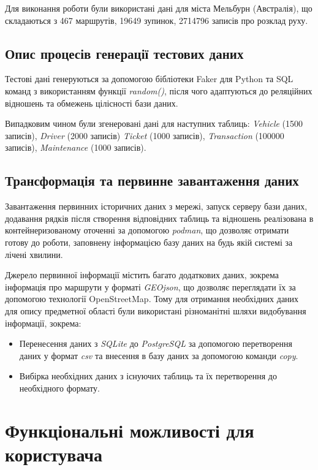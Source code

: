 \documentclass[oneside,14pt]{extarticle}
\begin{document}
Для виконання роботи були використані дані для міста Мельбурн (Австралія), що складаються з 467 маршрутів, 19649 зупинок, 2714796 записів про розклад руху.

\subsection{Опис процесів генерації тестових даних}
Тестові дані генеруються за допомогою бібліотеки Faker для Python та SQL команд з використанням функції \textit{random()}, після чого адаптуються до реляційних відношень та обмежень цілісності бази даних. 

Випадковим чином були згенеровані дані для наступних таблиць: \textit{Vehicle} (1500 записів), \textit{Driver} (2000 записів) \textit{Ticket} (1000 записів), \textit{Transaction} (100000 записів), \textit{Maintenance} (1000 записів).

\subsection{Трансформація та первинне завантаження даних}
Завантаження первинних історичних даних з мережі, запуск серверу бази даних, додавання рядків після створення відповідних таблиць та відношень реалізована в контейнеризованому оточенні за допомогою \textit{podman}, що дозволяє отримати готову до роботи, заповнену інформацією базу даних на будь якій системі за лічені хвилини.

Джерело первинної інформації містить багато додаткових даних, зокрема інформація про маршрути у форматі \textit{GEOjson}, що дозволяє переглядати їх за допомогою технології OpenStreetMap. Тому для отримання необхідних даних для опису предметної області були використані різноманітні шляхи видобування інформації, зокрема: 
\begin{itemize}
\item Перенесення даних з \textit{SQLite} до \textit{PostgreSQL} за допомогою перетворення даних у формат \textit{csv} та внесення в базу даних за допомогою команди \textit{copy}.
\item Вибірка необхідних даних з існуючих таблиць та їх перетворення до необхідного формату.
\end{itemize}

\newpage

\section{Функціональні можливості для користувача}
\end{document}
